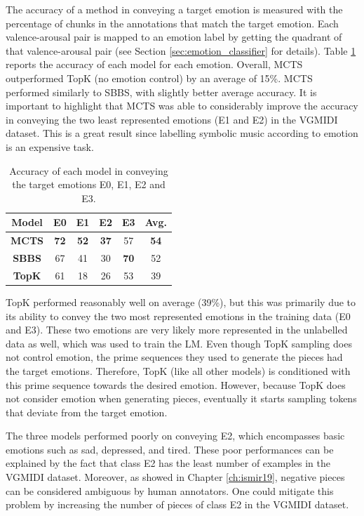 The accuracy of a method in conveying a target emotion is measured with the percentage of chunks in the annotations that match the target emotion. Each valence-arousal pair is mapped to an emotion label by getting the quadrant of that valence-arousal pair (see Section \ref{sec:emotion_classifier} for details).  Table \ref{tab:emotion} reports the accuracy of each model for each emotion. Overall, MCTS outperformed TopK (no emotion control) by an average of 15\%. MCTS performed similarly to SBBS, with slightly better average accuracy. It is important to highlight that MCTS was able to considerably improve the accuracy in conveying the two least represented emotions (E1 and E2) in the VGMIDI dataset. This is a great result since labelling symbolic music according to emotion is an expensive task.

\begin{table}[h]
    \centering
    \begin{tabular}{cccccc}
    \toprule
    \textbf{Model} & \textbf{E0} & \textbf{E1}  & \textbf{E2} & \textbf{E3} & \textbf{Avg.} \\
    \midrule
    \textbf{MCTS} & \textbf{72} & \textbf{52} & \textbf{37} & 57 & \textbf{54} \\
    \textbf{SBBS} & 67 & 41 & 30 & \textbf{70} & 52 \\
    \textbf{TopK} & 61 & 18 & 26 & 53 & 39 \\
    \bottomrule
    \end{tabular}
    \caption{Accuracy of each model in conveying the target emotions E0, E1, E2 and E3. }
    \label{tab:emotion}
\end{table}

TopK performed reasonably well on average (39\%), but this was primarily due to its ability to convey the two most represented emotions in the training data (E0 and E3). These two emotions are very likely more represented in the unlabelled data as well, which was used to train the LM. Even though TopK sampling does not control emotion, the prime sequences they used to generate the pieces had the target emotions. Therefore, TopK (like all other models) is conditioned with this prime sequence towards the desired emotion. However, because TopK does not consider emotion when generating pieces, eventually it starts sampling tokens that deviate from the target emotion.

The three models performed poorly on conveying E2, which encompasses basic emotions such as sad, depressed, and tired. These poor performances can be explained by the fact that class E2 has the least number of examples in the VGMIDI dataset. Moreover, as showed in Chapter \ref{ch:ismir19}, negative pieces can be considered ambiguous by human annotators. One could mitigate this problem by increasing the number of pieces of class E2 in the VGMIDI dataset.

